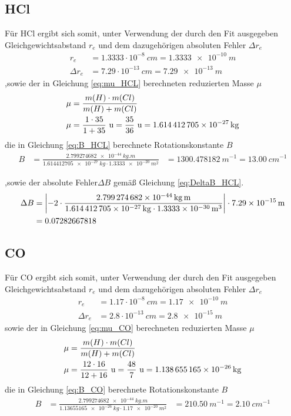 \subsection*{HCl}
Für HCl ergibt sich somit, unter Verwendung der durch den Fit ausgegeben Gleichgewichtsabstand $r_e$ und dem dazugehörigen absoluten Fehler $\Delta r_e$
\begin{align}
\label{eq:re_HCL}
r_e &= 1.3333 \cdot 10^{-8} ~\si{cm}=\SI[mode=math]{1.3333e-10}{m}
\\
\Delta r_e &= 7.29 \cdot 10^{-13} ~\si{cm}=\SI[mode=math]{7.29e-13}{m}
\end{align}
,sowie der in Gleichung \ref{eq:mu_HCL} berechneten reduzierten Masse $\mu$
\begin{align}
\mu&= \frac{m(H)\cdot m(Cl)}{m(H)+m(Cl)}\notag\\
\mu&= \frac{1\cdot35}{1+35} ~\si{u}=\frac{35}{36}~\si{u}=\SI[mode=math]{1.614412705e-27}{kg}\label{eq:mu_HCL}
\end{align}
die in Gleichung \ref{eq:B_HCL} berechnete Rotationskonstante $B$
\begin{align}
\label{eq:B_HCL}
B &=\frac{\SI[mode=math]{2.799274682e-44}{kg.m}}{\SI[mode=math]{1.614412705e-27}{kg}\cdot\SI[mode=math]{1.3333e-20}{m^{2}}}
&=\SI[mode=math]{1300.478182}{m^{-1}}
=\SI[mode=math]{13.00}{cm^{-1}}
\end{align}


,sowie der absolute Fehler$\Delta B$  gemäß Gleichung  \ref{eq:DeltaB_HCL}.  
\begin{align}
\Delta B &= \left|-2\cdot \frac{\SI[mode=math]{2.799274682e-44}{kg.m}}{\SI[mode=math]{1.614412705e-27}{kg}\cdot\SI[mode=math]{1.3333e-30}{m^{3}}}\right| \cdot \SI[mode=math]{7.29e-15}{m}
\notag\\
&= 0.07282667818\label{eq:DeltaB_HCL}
\end{align} 


\subsection*{CO}
Für CO ergibt sich somit, unter Verwendung der durch den Fit ausgegeben Gleichgewichtsabstand $r_e$ und dem dazugehörigen absoluten Fehler $\Delta r_e$
\begin{align}
\label{eq:r_CO}
r_e &= 1.17 \cdot 10^{-8} ~\si{cm}=\SI[mode=math]{1.17e-10}{m}
\\
\Delta r_e &= 2.8 \cdot 10^{-13} ~\si{cm}=\SI[mode=math]{2.8e-15}{m}
\end{align}
 sowie der in Gleichung \ref{eq:mu_CO} berechneten reduzierten Masse $\mu$
\begin{align}
\mu&= \frac{m(H)\cdot m(Cl)}{m(H)+m(Cl)}\notag\\
\mu&= \frac{12\cdot16}{12+16} ~\si{u}=\frac{48}{7}~\si{u}=\SI[mode=math]{1.138655165e-26}{kg}\label{eq:mu_CO}
\end{align}
die in Gleichung \ref{eq:B_CO} berechnete Rotationskonstante $B$
\begin{align}
\label{eq:B_CO}
B &=\frac{\SI[mode=math]{2.799274682e-44}{kg.m}}{\SI[mode=math]{1.13655165e-26}{kg}\cdot\SI[mode=math]{1.17e-20}{m^{2}}}
&=\SI[mode=math]{210.50}{m^{-1}}
=\SI[mode=math]{2.10}{cm^{-1}}
\end{align}


